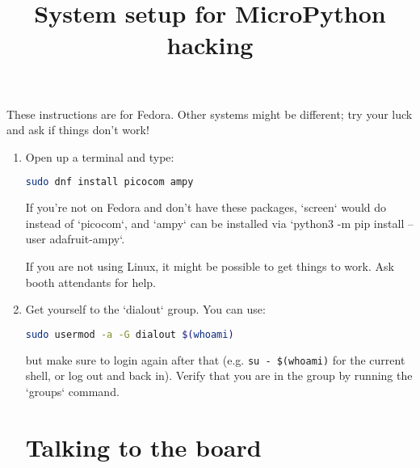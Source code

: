 \documentclass{../tutorial}
\title{System setup for MicroPython \abbr{ESP32} hacking}
\begin{document}
These instructions are for Fedora.
Other systems might be different; try your luck and ask if things
don't work!

\begin{comment}
    The boards have plain firmware from
    \url{http://micropython.org/download}
    with just a few additional drivers.
    These activities are quite low-level on purpose;
    it is possible to find nicer-to-use libraries
    for most of the tasks presented here.
\end{comment}

\begin{enumerate}

\section{Installation}

\item
    Open up a terminal and type:

    \begin{lstlisting}[language=bash]
    sudo dnf install picocom ampy
    \end{lstlisting}

    If you're not on Fedora and don't have these packages,
    `screen` would do instead of `picocom`,
    and `ampy` can be installed via
    `python3 -m pip install --user adafruit-ampy`.

    If you are not using Linux, it might be possible to get things to work.
    Ask booth attendants for help.

\item
    Get yourself to the `dialout` group.
    You can use:

    \begin{lstlisting}[language=bash]
    sudo usermod -a -G dialout $(whoami)
    \end{lstlisting}

    but make sure to login again after that
    (e.g. \lstinline|su - $(whoami)| for the current shell, or log out and
    back in).
    Verify that you are in the group by running the `groups` command.

    \begin{comment}
        The `dialout` group is historically designed for modems
        and gives you full and direct access to serial ports.
    \end{comment}

\section{Talking to the board}


\end{enumerate}
\end{document}
